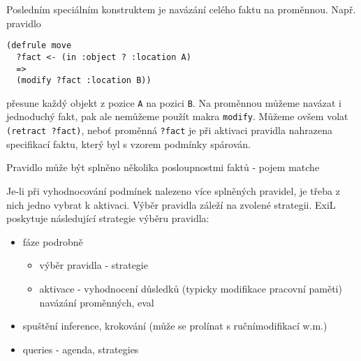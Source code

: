 Posledním speciálním konstruktem je navázání celého faktu na proměnnou. Např.
pravidlo
\begin{verbatim}
(defrule move
  ?fact <- (in :object ? :location A)
  =>
  (modify ?fact :location B))
\end{verbatim}
přesune každý objekt z pozice \verb|A| na pozici \verb|B|. Na proměnnou
můžeme navázat i jednoduchý fakt, pak ale nemůžeme použít makra \verb|modify|.
Můžeme ovšem volat \verb|(retract ?fact)|, neboť proměnná \verb|?fact| je při
aktivaci pravidla nahrazena specifikací faktu, který byl s vzorem podmínky
spárován.

\begin{framed}
  Pravidlo může být splněno několika posloupnostmi faktů - pojem matche
\end{framed}

Je-li při vyhodnocování podmínek nalezeno více splněných pravidel, je třeba z
nich jedno vybrat k aktivaci. Výběr pravidla záleží na zvolené strategii.
ExiL poskytuje následující strategie výběru pravidla:
\begin{description}[leftmargin=6cm,style=sameline,align=right,labelsep=0.5cm]
  \item[depth-strategy]
\end{description}

\begin{framed}
  \begin{itemize}
    \item fáze podrobně
    \begin{itemize}
      \item výběr pravidla - strategie
      \item aktivace - vyhodnocení důsledků (typicky modifikace pracovní paměti)
        navázání proměnných, eval
    \end{itemize}
    \item spuštění inference, krokování (může se prolínat s ručnímodifikací w.m.)
    \item queries - agenda, strategies
  \end{itemize}
\end{framed}
